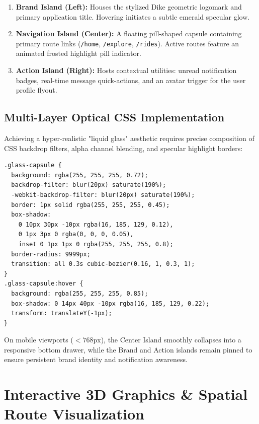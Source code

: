 \documentclass[conference,10pt,a4paper]{IEEEtran}
\begin{document}
\begin{enumerate}
    \item \textbf{Brand Island (Left):} Houses the stylized Dike geometric logomark and primary application title. Hovering initiates a subtle emerald specular glow.
    \item \textbf{Navigation Island (Center):} A floating pill-shaped capsule containing primary route links (\texttt{/home}, \texttt{/explore}, \texttt{/rides}). Active routes feature an animated frosted highlight pill indicator.
    \item \textbf{Action Island (Right):} Hosts contextual utilities: unread notification badges, real-time message quick-actions, and an avatar trigger for the user profile flyout.
\end{enumerate}

\subsection{Multi-Layer Optical CSS Implementation}
Achieving a hyper-realistic "liquid glass" aesthetic requires precise composition of CSS backdrop filters, alpha channel blending, and specular highlight borders:
\begin{lstlisting}[language=HTML,caption={Multi-Layer Optical Liquid Glass CSS Recipe}]
.glass-capsule {
  background: rgba(255, 255, 255, 0.72);
  backdrop-filter: blur(20px) saturate(190%);
  -webkit-backdrop-filter: blur(20px) saturate(190%);
  border: 1px solid rgba(255, 255, 255, 0.45);
  box-shadow: 
    0 10px 30px -10px rgba(16, 185, 129, 0.12),
    0 1px 3px 0 rgba(0, 0, 0, 0.05),
    inset 0 1px 1px 0 rgba(255, 255, 255, 0.8);
  border-radius: 9999px;
  transition: all 0.3s cubic-bezier(0.16, 1, 0.3, 1);
}
.glass-capsule:hover {
  background: rgba(255, 255, 255, 0.85);
  box-shadow: 0 14px 40px -10px rgba(16, 185, 129, 0.22);
  transform: translateY(-1px);
}
\end{lstlisting}

On mobile viewports ($< 768\text{px}$), the Center Island smoothly collapses into a responsive bottom drawer, while the Brand and Action islands remain pinned to ensure persistent brand identity and notification awareness.

\section{Interactive 3D Graphics \& Spatial Route Visualization}
\end{document}
